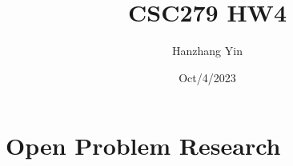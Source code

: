 \documentclass{article}
\title{CSC279 HW4}
\author{Hanzhang Yin}
\date{Oct/4/2023}
\begin{document}
\maketitle

\section{Open Problem Research}
\end{document}
